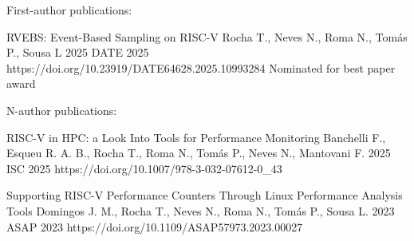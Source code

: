 
\begin{cvpublications}{First-author publications:}

	{RVEBS: Event-Based Sampling on RISC-V}
	{Rocha T., Neves N., Roma N., Tomás P., Sousa L}
	{2025}
	{DATE 2025}
	{https://doi.org/10.23919/DATE64628.2025.10993284}
	{Nominated for best paper award}

\end{cvpublications}







\begin{cvpublications}{N-author publications:}

	
    {RISC-V in HPC: a Look Into Tools for Performance Monitoring}
	{Banchelli F., Esqueu R. A. B., Rocha T., Roma N., Tomás P., Neves N., Mantovani F.}
	{2025}
    {ISC 2025}
    {https://doi.org/10.1007/978-3-032-07612-0_43}
	{}
	
    {Supporting RISC-V Performance Counters Through Linux Performance Analysis Tools}
	{Domingos J. M., Rocha T., Neves N., Roma N., Tomás P., Sousa L.}
	{2023}
    {ASAP 2023}
    {https://doi.org/10.1109/ASAP57973.2023.00027}
	{}

\end{cvpublications}
